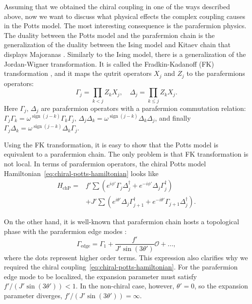 \documentclass[reprint, aps, prx, amsmath, amssymb, longbibliography, superscriptaddress]{revtex4-2}
\DeclareMathOperator{\sgn}{sign}
\begin{document}
Assuming that we obtained the chiral coupling in one of the ways described above, now we want to discuss what physical effects the complex coupling causes in the Potts model. The most interesting consequence is the parafermion physics. The duality between the Potts model and the parafermion chain is the generalization of the duality between the Ising model and Kitaev chain that displays Majoranas \cite{kitaev_unpaired_2001}. Similarly to the Ising model, there is a generalization of the Jordan-Wigner transformation. It is called the Fradkin-Kadanoff (FK) transformation \cite{fradkin_disorder_1980}, and it maps the qutrit operators $X_j$ and $ Z_j$ to the parafermions operators:
\begin{equation}
\Gamma_j = \prod\limits_{k<j} Z_k X_j , \quad \Delta_j = \prod\limits_{k\le j} Z_k X_j.
\end{equation}
Here $\Gamma_j, \, \Delta_j$ are parafermion operators with a parafermion commutation relation: $\Gamma_j \Gamma_k = \omega^{\sgn(j-k)} \Gamma_k \Gamma_j, \, \Delta_j \Delta_k = \omega^{\sgn(j-k)} \Delta_k \Delta_j$, and finally $\Gamma_j \Delta_k = \omega^{\sgn(j-k)} \Delta_k \Gamma_j$.

Using the FK transformation, it is easy to show that the Potts model is equivalent to a parafermion chain. The only problem is that FK transformation is not local. In terms of parafermion operators, the chiral Potts model Hamiltonian~\eqref{eq:chiral-potts-hamiltonian} looks like 
\begin{equation}
\begin{aligned}
    H_{\text{chP}} = &f' \sum \left( e^{i\phi'} \Gamma_j \Delta_j^{\dagger} + e^{-i\phi'} \Delta_j \Gamma_j^{\dagger}\right) \\
    &+J' \sum \left(e^{i\theta'} \Delta_j \Gamma_{j+1}^{\dagger} + e^{-i\theta'} \Gamma_{j+1} \Delta_j^{\dagger}\right).
\end{aligned}
\end{equation}

On the other hand, it is well-known that parafermion chain hosts a topological phase with the parafermion edge modes  \cite{fendley_parafermionic_2012}:
\begin{equation}
\label{eq:parafermion-edge-mode}
\Gamma_{\text{edge}} = \Gamma_1 + \frac{f'}{J' \sin(3\theta')} \mathcal{O} + \dots,
\end{equation}
where the dots represent higher order terms.
This expression also clarifies why we required the chiral coupling~\eqref{eq:chiral-potts-hamiltonian}. For the parafermion edge mode to be localized, the expansion parameter must satisfy $f'/(J'\sin(3\theta')) < 1$. In the non-chiral case, however, $\theta' = 0 $, so the expansion parameter diverges, $f'/(J'\sin(3\theta')) = \infty$.
\end{document}
